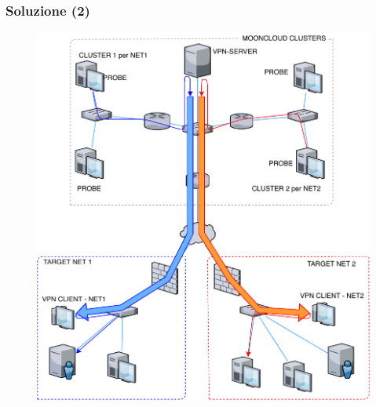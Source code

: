\begin{frame}
	\frametitle{Soluzione (2)}
	\begin{figure}
		\includegraphics[scale=0.45]{img/ls}
	\end{figure}
\end{frame}




